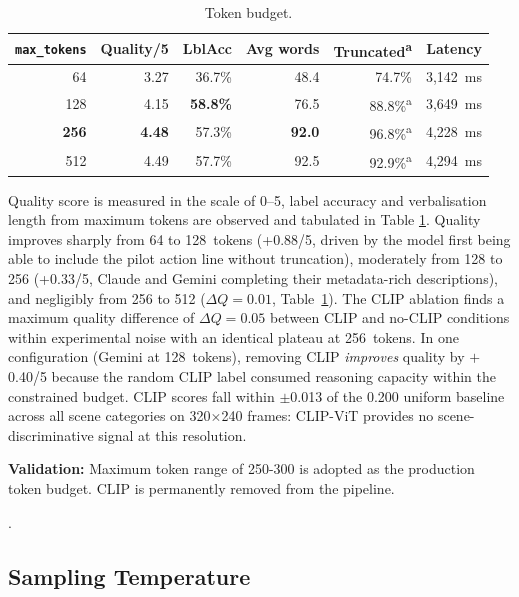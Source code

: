 \begin{table}[ht]
  \caption{Token budget.}
  \label{tab:ch2_v6}
  \centering
  \small
  \begin{tabular}{rrrrrr}
    \toprule
    \texttt{max\_tokens} & Quality/5 & LblAcc & Avg words & Truncated\textsuperscript{a} & Latency \\
    \midrule
    64              & 3.27 & 36.7\% & 48.4 & 74.7\%  & 3,142~ms \\
    128             & 4.15 & \textbf{58.8\%} & 76.5 & 88.8\%\textsuperscript{a} & 3,649~ms \\
    \textbf{256}    & \textbf{4.48} & 57.3\% & \textbf{92.0} & 96.8\%\textsuperscript{a} & 4,228~ms \\
    512             & 4.49 & 57.7\% & 92.5 & 92.9\%\textsuperscript{a} & 4,294~ms \\
    \bottomrule
  \end{tabular}
\end{table}

Quality score is measured in the scale of 0--5, label accuracy and verbalisation length from maximum tokens are observed and tabulated in Table \ref{tab:ch2_v6}.
Quality improves sharply from 64 to 128~tokens (+0.88/5, driven by the model first being able to include the pilot action line without truncation), moderately from 128 to 256 (+0.33/5, Claude and Gemini completing their metadata-rich descriptions), and negligibly from 256 to 512 ($\Delta Q = 0.01$, Table~\ref{tab:ch2_v6}). 
The CLIP ablation finds a maximum quality difference
of $\Delta Q = 0.05$ between CLIP and no-CLIP conditions within experimental noise with an identical plateau at 256~tokens. 
In one configuration (Gemini at 128~tokens), removing CLIP \emph{improves} quality by $+$0.40/5 because the
random CLIP label consumed reasoning capacity within the constrained budget.
CLIP scores fall within $\pm$0.013 of the 0.200 uniform baseline across all scene categories on 320$\times$240 frames: CLIP-ViT provides no scene-discriminative signal at this resolution.

\textbf{Validation:} Maximum token range of 250-300 is adopted as the production token budget. 
CLIP is permanently removed from the pipeline.

.
\subsection{Sampling Temperature}
\label{sec:ch2_v8}

